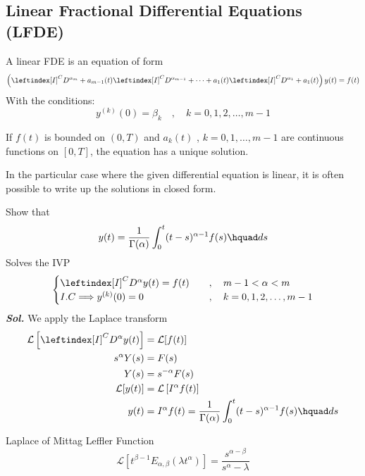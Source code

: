 \subsection{Linear Fractional Differential Equations (LFDE)}
A linear FDE is an equation of form
\[
    \left(\leftindex[I]^C {D^{\alpha_m}} + a_{m-1}(t)\leftindex[I]^C {D^{\alpha_{m-1}}} + \dots + a_{1}(t)\leftindex[I]^C {D^{\alpha_{1}}} + a_{1}(t) \right) y(t) = f(t)
\]
With the conditions:
\[
    y^{(k)}(0) = \beta_k \quad,\quad k = 0,1,2,\dots,m-1
\]
\begin{theorem}
    If $f(t)$ is bounded on $(0, T)$ and $a_{k}(t)$ , $k = {0, 1, \dots , m-1}$ 
    are continuous functions on $[0, T]$, the equation has a unique solution.
\end{theorem}
In the particular case where the given differential equation is linear, it is often possible
to write up the solutions in closed form.
\begin{example}
    Show that 
    \[
        y(t) = \frac{1}{\Gamma(\alpha)}\int_{0}^{t} (t-s)^{\alpha-1}f(s) \hquad ds
    \]
    Solves the IVP 
    \[
        \begin{cases}
            \leftindex[I]^C {D^{\alpha}} y(t) = f(t)    \quad&,\quad m-1<\alpha<m
            \\
            I.C \Longrightarrow y^{(k)}(0) = 0 \quad&,\quad k = 0,1,2,\dots,m-1
        \end{cases}
    \]
    \textit{ \textbf{Sol.} } We apply the Laplace transform
        \begin{align*}
            \mathcal{L}\left[\leftindex[I]^C {D^{\alpha}} y(t)\right] &= \mathcal{L}[f(t)]
            \\
            s^{\alpha} Y(s) &= F(s)
            \\
            Y(s) &= s^{-\alpha}F(s)
            \\
            \mathcal{L}[y(t)] &= \mathcal{L}\left[I^{\alpha}f(t)\right]
            \\
            y(t) &= I^{\alpha}f(t) = \frac{1}{\Gamma(\alpha)}\int_{0}^{t} (t-s)^{\alpha-1}f(s) \hquad ds
        \end{align*}
\end{example}
\begin{enrichment*}{Laplace of Mittag Leffler Function }
    \[
        \mathcal{L}\left[t^{\beta-1} E_{\alpha,\beta}(\lambda t^\alpha)\right] = \frac{s^{\alpha - \beta}}{s^{\alpha}-\lambda}
    \]
\end{enrichment*}
